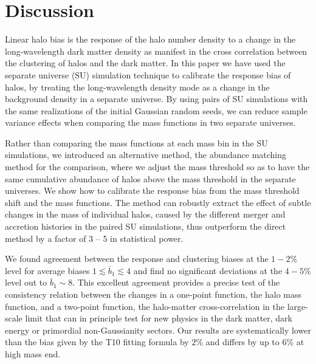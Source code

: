\documentclass[prd,twocolumn,amsmath,amssymb,floatfix,superscriptaddress]{revtex4-1}
\begin{document}
\section{Discussion}
\label{sec:disc}

Linear halo bias is the response of the halo 
number density to a change in the long-wavelength dark matter density as manifest 
in the cross correlation between the clustering of halos and the dark matter.  
In this paper we have used the separate universe (SU) simulation
technique to calibrate the response bias of halos, by treating the
long-wavelength density mode as a change in the background density in a
separate universe. By using  pairs of SU simulations with the same
realizations of the initial Gaussian random seeds, we can reduce sample
variance effects when comparing the mass functions in two separate
universes. 

Rather than comparing the mass functions at each mass bin in the SU simulations, we introduced an alternative method, the abundance
matching method for the comparison, where we adjust the mass threshold
so as to have the same cumulative abundance of halos above the mass
threshold in the separate universes. We show how to calibrate the response bias
from the mass threshold shift and the mass functions. 
The method can robustly extract the effect of subtle changes in the
mass of individual halos, caused by the different merger and accretion
histories in the paired SU simulations,
thus outperform the direct method by a factor of 3 -- 5 in statistical power.

We found  agreement between the response and clustering
biases at the $1-2\%$ level for average biases $1 \lesssim \bar b_1 \lesssim 4$
and find no  significant deviations at the $4-5\%$ level out to $\bar b_1 \sim  8$.
 This excellent agreement provides a precise test of the
consistency relation between the changes in a one-point function, the
halo mass function, and a two-point function, the halo-matter
cross-correlation in the large-scale limit that can in principle test for new physics
in the dark matter, dark energy or primordial non-Gaussianity sectors.  
Our results are
systematically lower than the bias given by the T10 fitting formula \cite{Tinkeretal:10} 
by $2\%$  and differs by up to $6\%$  at high mass end.
\end{document}
